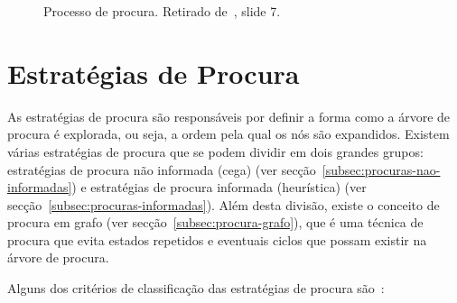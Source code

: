 \begin{figure}[H]
    \begin{center}
    \end{center}
    \caption{Processo de procura.
    Retirado de~\cite{isel:iasa:slides:proc-espaco-estados-parte-1}, slide 7.}
    \label{fig:processo-procura}
\end{figure}


\section{Estratégias de Procura}\label{sec:estrategias-procura}
As estratégias de procura são responsáveis por definir a forma como a árvore de procura é explorada, ou seja, a ordem pela qual os nós são expandidos.
Existem várias estratégias de procura que se podem dividir em dois grandes grupos: estratégias de procura não informada (cega) (ver secção~\ref{subsec:procuras-nao-informadas}) e estratégias de procura informada (heurística) (ver secção~\ref{subsec:procuras-informadas}).
Além desta divisão, existe o conceito de procura em grafo (ver secção~\ref{subsec:procura-grafo}), que é uma técnica de procura que evita estados repetidos e eventuais ciclos que possam existir na árvore de procura.

Alguns dos critérios de classificação das estratégias de procura são~\cite{ist:leic:resumos:procura-cega, isel:iasa:slides:proc-espaco-estados-parte-2}:

